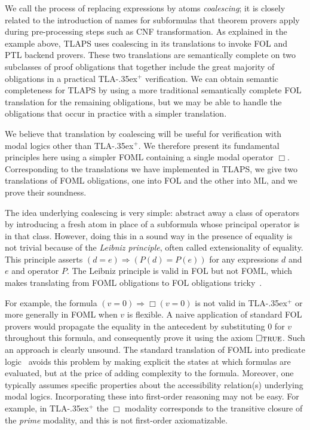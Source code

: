 \documentclass[a4paper,fleqn,envcountsame,orivec]{llncs}
\newcommand{\implies}{\Rightarrow}
\newcommand{\tlaplus}{\mbox{TLA\kern -.35ex$^+$}\xspace}
\newcommand{\edmargin}[2]{\marginpar{\raggedright\footnotesize\color{red}#1: #2}}
\newcommand{\edmargin}[2]{}
\def\llmargin{\edmargin{LL}}
\def\ddmargin{\edmargin{DD}}
\begin{document}
We call the process of replacing expressions by atoms \emph{coalescing}; it is
closely related to the introduction of names for subformulas that theorem
provers apply during pre-processing steps such as CNF transformation. As
explained in the example above, TLAPS uses coalescing in its translations to
invoke FOL and PTL backend provers.
These two translations are semantically complete on two subclasses
of proof obligations that together include the great majority of
obligations in a practical \tlaplus verification.  We can obtain
semantic completeness for TLAPS by using a more traditional
semantically complete FOL translation for the remaining obligations,
but we may be able to handle the obligations that
occur in practice with a simpler translation.

We believe that translation by coalescing will be useful for verification with
modal logics other than \tlaplus. We therefore present its fundamental
principles here using a simpler FOML containing a single modal operator $\Box$.
Corresponding to the translations we have implemented in TLAPS, we give two
translations of FOML obligations, one into FOL and the other into ML, and we
prove their soundness.

The idea underlying coalescing is very simple: abstract away a class
of operators by introducing a fresh atom in place of a subformula
whose principal operator is in that class.
However, doing this in a sound way in the presence of equality is not
trivial because of the \emph{Leibniz principle}, often called
{extensionality of equality}.  This principle asserts
 $(d=e) \Rightarrow (P(d) = P(e))$
for any expressions $d$ and $e$ and operator $P$.  The Leibniz
principle is valid in FOL but not FOML, which makes translating from
FOML obligations to FOL obligations tricky~\cite{mendelsohn:foml}.

For example, the formula $(v=0) \implies \Box(v=0)$ is not valid in \tlaplus or
more generally in FOML when $v$ is flexible.
A naive application of standard FOL provers would
propagate the equality in the antecedent by substituting $0$ for $v$
throughout this formula, and consequently prove it using the axiom
$\square\mbox{\sc true}$. Such an approach is clearly unsound.
The standard translation of FOML into predicate logic~\cite{ohlbach:translation}
avoids this problem by making explicit the states at which formulas are
evaluated, but at the price of adding complexity to the formula. Moreover, one
typically assumes specific properties about the accessibility relation(s)
underlying modal logics.  Incorporating these into first-order reasoning may
not be easy. For example, in \tlaplus the $\Box$ modality corresponds to the
transitive closure of the \emph{prime} modality, and this is not first-order
axiomatizable.
\end{document}

